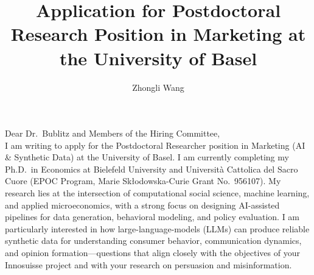 \documentclass{nfr}
\title{Application for Postdoctoral Research Position in Marketing at the University of Basel}
\author{Zhongli Wang}
\begin{document}

% 
% 
% 
% 


\maketitle


\noindent Dear Dr.~Bublitz and Members of the Hiring Committee,\\[0.2cm]

I am writing to apply for the Postdoctoral Researcher position in Marketing (AI \& Synthetic Data) at the University of Basel. 
I am currently completing my Ph.D.\ in Economics at Bielefeld University and Università Cattolica del Sacro Cuore (EPOC Program, Marie Skłodowska-Curie Grant No.~956107). 
My research lies at the intersection of computational social science, machine learning, and applied microeconomics, with a strong focus on designing AI-assisted pipelines for data generation, behavioral modeling, and policy evaluation. 
I am particularly interested in how large-language-models (LLMs) can produce reliable synthetic data for understanding consumer behavior, communication dynamics, and opinion formation—questions that align closely with the objectives of your Innosuisse project and with your research on persuasion and misinformation.\\
\end{document}
